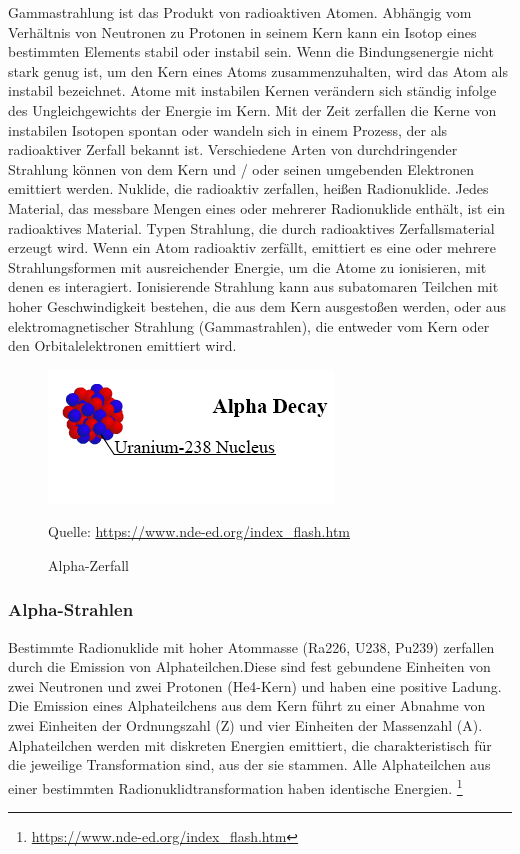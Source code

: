 Gammastrahlung ist das Produkt von radioaktiven Atomen. Abhängig vom Verhältnis von Neutronen zu Protonen in seinem Kern kann ein Isotop eines bestimmten Elements stabil oder instabil sein. Wenn die Bindungsenergie nicht stark genug ist, um den Kern eines Atoms zusammenzuhalten, wird das Atom als instabil bezeichnet. Atome mit instabilen Kernen verändern sich ständig infolge des Ungleichgewichts der Energie im Kern. Mit der Zeit zerfallen die Kerne von instabilen Isotopen spontan oder wandeln sich in einem Prozess, der als radioaktiver Zerfall bekannt ist. Verschiedene Arten von durchdringender Strahlung können von dem Kern und / oder seinen umgebenden Elektronen emittiert werden. Nuklide, die radioaktiv zerfallen, heißen Radionuklide. Jedes Material, das messbare Mengen eines oder mehrerer Radionuklide enthält, ist ein radioaktives Material.
Typen Strahlung, die durch radioaktives Zerfallsmaterial erzeugt wird.
Wenn ein Atom radioaktiv zerfällt, emittiert es eine oder mehrere Strahlungsformen mit ausreichender Energie, um die Atome zu ionisieren, mit denen es interagiert. Ionisierende Strahlung kann aus subatomaren Teilchen mit hoher Geschwindigkeit bestehen, die aus dem Kern ausgestoßen werden, oder aus elektromagnetischer Strahlung (Gammastrahlen), die entweder vom Kern oder den Orbitalelektronen emittiert wird.
\begin{figure}[htb]
  \centering  
  \includegraphics[scale=0.7]{img/uranium.png}
  \caption{Alpha-Zerfall}
  \label{fig:uranium}
Quelle: \url{https://www.nde-ed.org/index_flash.htm}
\end{figure}

 \subsubsection{Alpha-Strahlen}
 
\grqq Bestimmte Radionuklide mit hoher Atommasse (Ra226, U238, Pu239) zerfallen durch die Emission von Alphateilchen.Diese sind fest gebundene Einheiten von zwei Neutronen und zwei Protonen (He4-Kern) und haben eine positive Ladung. Die Emission eines Alphateilchens aus dem Kern führt zu einer Abnahme von zwei Einheiten der Ordnungszahl (Z) und vier Einheiten der Massenzahl (A). Alphateilchen werden mit diskreten Energien emittiert, die charakteristisch für die jeweilige Transformation sind, aus der sie stammen. Alle Alphateilchen aus einer bestimmten Radionuklidtransformation haben identische Energien.\grqq
\footnote[5]{\url{https://www.nde-ed.org/index_flash.htm}}\\
